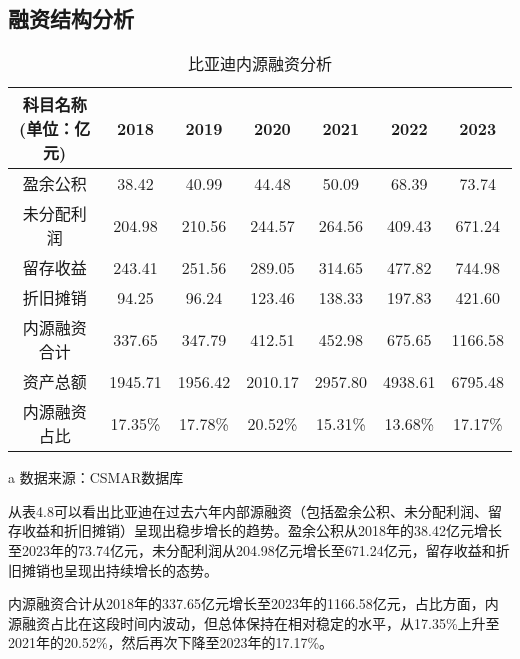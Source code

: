 \subsection{融资结构分析}
\begin{table}
  \centering
  \begin{threeparttable}[c]
    \caption{比亚迪内源融资分析}
    \label{tab:capital-from-inside}
    \begin{tabular}{ccccccc}
      \toprule
        科目名称(单位：亿元) & 2018 & 2019 & 2020 & 2021 & 2022 & 2023 \\ 
      \midrule
        盈余公积 & 38.42  & 40.99  & 44.48  & 50.09  & 68.39  & 73.74  \\ 
        未分配利润 & 204.98  & 210.56  & 244.57  & 264.56  & 409.43  & 671.24  \\ 
        留存收益 & 243.41  & 251.56  & 289.05  & 314.65  & 477.82  & 744.98  \\ 
        折旧摊销 & 94.25  & 96.24  & 123.46  & 138.33  & 197.83  & 421.60  \\ 
        内源融资合计 & 337.65  & 347.79  & 412.51  & 452.98  & 675.65  & 1166.58  \\ 
        资产总额 & 1945.71  & 1956.42  & 2010.17  & 2957.80  & 4938.61  & 6795.48  \\ 
        内源融资占比 & 17.35\% & 17.78\% & 20.52\% & 15.31\% & 13.68\% & 17.17\% \\ 
      \bottomrule
    \end{tabular}
    \begin{tablenotes}
      \item [a] 数据来源：CSMAR数据库
    \end{tablenotes}
  \end{threeparttable}
\end{table}
从表4.8可以看出比亚迪在过去六年内部源融资（包括盈余公积、未分配利润、留存收益和折旧摊销）呈现出稳步增长的趋势。盈余公积从2018年的38.42亿元增长至2023年的73.74亿元，未分配利润从204.98亿元增长至671.24亿元，留存收益和折旧摊销也呈现出持续增长的态势。

内源融资合计从2018年的337.65亿元增长至2023年的1166.58亿元，占比方面，内源融资占比在这段时间内波动，但总体保持在相对稳定的水平，从17.35\%上升至2021年的20.52\%，然后再次下降至2023年的17.17\%。

